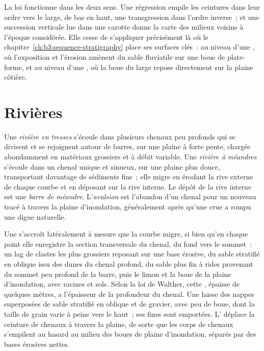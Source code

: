 La loi fonctionne dans les deux sens. Une régression empile les ceintures dans leur ordre
vers le large, de bas en haut, une transgression dans l'ordre inverse~; et une succession verticale lue dans une
carotte donne la carte des milieux voisins à l'époque considérée. Elle cesse de s'appliquer
précisément là où le chapitre~\ref{ch:b3:sequence-stratigraphy} place ses surfaces clés~:
au niveau d'une , où l'exposition et l'érosion amènent du sable fluviatile
sur une boue de plate-forme, et au niveau d'une , où la boue du large repose
directement sur la plaine côtière.

\section{Rivières}\label{sec:b3:facies-models:rivers}

\begin{definition}\label{def:b3:facies-models:rivers}
Une \emph{rivière en tresses} s'écoule dans plusieurs chenaux peu profonds
qui se divisent et se rejoignent autour de barres, sur une plaine à forte pente, chargée abondamment en matériaux grossiers
et à débit variable. Une \emph{rivière à méandres}
s'écoule dans un chenal unique et sinueux, sur une plaine plus douce, transportant davantage
de sédiments fins~; elle migre en érodant la rive externe de chaque courbe et
en déposant sur la rive interne. Le dépôt de la rive interne est une \emph{barre de
méandre}. L'\emph{avulsion} est
l'abandon d'un chenal pour un nouveau tracé à travers la plaine d'inondation, généralement après qu'une crue
a rompu une digue naturelle.
\end{definition}

Une  s'accroît latéralement à mesure que la courbe migre, si bien qu'en chaque point
elle enregistre la section transversale du chenal, du fond vers le sommet~: un lag de clastes les plus grossiers
reposant sur une base érosive, du sable stratifié en oblique issu des dunes du
chenal profond, du sable plus fin à rides provenant du sommet peu profond de la barre, puis le
limon et la boue de la plaine d'inondation, avec racines et sols. Selon la loi de Walther, cette
, épaisse de quelques mètres, a l'épaisseur de la
profondeur du chenal. Une  laisse des nappes superposées de sable
stratifié en oblique et de gravier, avec peu de boue, dont la taille de grain varie à peine vers le haut~; ses fines
sont emportées. L' déplace la ceinture de chenaux à travers la plaine, de sorte que
les corps de chenaux s'empilent au hasard au milieu des boues de plaine d'inondation, séparés par des bases
érosives nettes.

